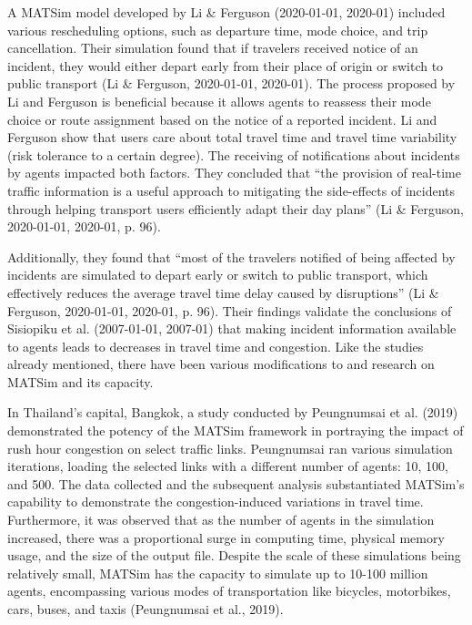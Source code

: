 \documentclass[fancy, oneside, mastersfancy, ms]{byuthesis}
\begin{document}
A MATSim model developed by Li \& Ferguson (2020-01-01, 2020-01)
included various rescheduling options, such as departure time, mode
choice, and trip cancellation. Their simulation found that if travelers
received notice of an incident, they would either depart early from
their place of origin or switch to public transport (Li \& Ferguson,
2020-01-01, 2020-01). The process proposed by Li and Ferguson is
beneficial because it allows agents to reassess their mode choice or
route assignment based on the notice of a reported incident. Li and
Ferguson show that users care about total travel time and travel time
variability (risk tolerance to a certain degree). The receiving of
notifications about incidents by agents impacted both factors. They
concluded that ``the provision of real-time traffic information is a
useful approach to mitigating the side-effects of incidents through
helping transport users efficiently adapt their day plans'' (Li \&
Ferguson, 2020-01-01, 2020-01, p. 96).

Additionally, they found that ``most of the travelers notified of being
affected by incidents are simulated to depart early or switch to public
transport, which effectively reduces the average travel time delay
caused by disruptions'' (Li \& Ferguson, 2020-01-01, 2020-01, p. 96).
Their findings validate the conclusions of Sisiopiku et al. (2007-01-01,
2007-01) that making incident information available to agents leads to
decreases in travel time and congestion. Like the studies already
mentioned, there have been various modifications to and research on
MATSim and its capacity.

In Thailand's capital, Bangkok, a study conducted by Peungnumsai et al.
(2019) demonstrated the potency of the MATSim framework in portraying
the impact of rush hour congestion on select traffic links. Peungnumsai
ran various simulation iterations, loading the selected links with a
different number of agents: 10, 100, and 500. The data collected and the
subsequent analysis substantiated MATSim's capability to demonstrate the
congestion-induced variations in travel time. Furthermore, it was
observed that as the number of agents in the simulation increased, there
was a proportional surge in computing time, physical memory usage, and
the size of the output file. Despite the scale of these simulations
being relatively small, MATSim has the capacity to simulate up to 10-100
million agents, encompassing various modes of transportation like
bicycles, motorbikes, cars, buses, and taxis (Peungnumsai et al., 2019).
\end{document}
